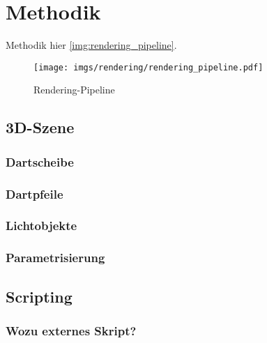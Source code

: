 
\section{Methodik}
\label{sec:daten:methodik}

Methodik hier \autoref{img:rendering_pipeline}.

\begin{figure}
    \centering
    \texttt{[image: imgs/rendering/rendering\_pipeline.pdf]}
    \caption{Rendering-Pipeline}
    \label{img:rendering_pipeline}
\end{figure}

\subsection{3D-Szene} %

\subsubsection{Dartscheibe}

\todo{}

\subsubsection{Dartpfeile}

\todo{}

\subsubsection{Lichtobjekte}

\todo{}

\subsubsection{Parametrisierung}

\todo{}



\subsection{Scripting}  %
\label{sec:scripting}

\subsubsection{Wozu externes Skript?}

